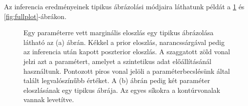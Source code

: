 Az inferencia eredményeinek tipikus ábrázolási módjaira láthatunk példát a \ref{fig:marginal_joint} és \ref{fig:fullplot}-ábrákon.

\begin{figure}[h!]
	\centering
	\caption[Marginális eloszlás és együttes eloszlás típikus ábrái]{Egy paraméterre vett marginális eloszlás egy tipikus ábrázolása látható az (a) ábrán. Kékkel a prior eloszlás, narancssárgával pedig az inferencia után kapott poszterior eloszlás. A szaggatott zöld vonal jelzi azt a paramétert, amelyet a szintetikus adat előállításánál használtunk. Pontozott piros vonal jelöli a paraméterbecslésünk által talált legvalószínűbb értéket. A (b) ábrán pedig két paraméter eloszlásának egy tipikus ábrája. Az egyes síkokra a kontúrvonalak vannak levetítve.}%
	\label{fig:marginal_joint}
\end{figure}


